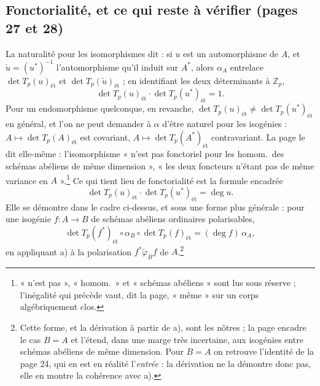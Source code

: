 \documentclass[11pt,a4paper]{article}
\begin{document}
\subsection*{Fonctorialité, et ce qui reste à vérifier (pages 27 et 28)}

La naturalité pour les isomorphismes dit : si $u$ est un automorphisme de $A$,
et $\check u = (u^*)^{-1}$ l'automorphisme qu'il induit sur $A^*$, alors
$\alpha_A$ entrelace $\det T_p(u)_{\text{ét}}$ et $\det T_p(\check
u)_{\text{ét}}$ ; en identifiant les deux déterminants à $\mathbb{Z}_p$,
\[
\det T_p(u)_{\text{ét}} \cdot \det T_p(u^*)_{\text{ét}} = 1 .
\]
Pour un endomorphisme quelconque, en revanche, $\det T_p(u)_{\text{ét}} \neq
\det T_p(u^*)_{\text{ét}}$ en général, et l'on ne peut demander à $\alpha$
d'être naturel pour les isogénies : $A \mapsto \det T_p(A)_{\text{ét}}$ est
covariant, $A \mapsto \det T_p(A^*)_{\text{ét}}$ contravariant. La page le dit
elle-même : l'isomorphisme « n'est pas fonctoriel pour les homom.\ des schémas
abéliens de même dimension », « les deux foncteurs n'étant pas de même
variance en $A$ ».\footnote{« n'est pas », « homom.\ » et « schémas
abéliens » sont lus sous réserve ; l'inégalité qui précède vaut, dit la page,
« même » sur un corps algébriquement clos.}
Ce qui tient lieu de fonctorialité est la formule encadrée
\[
\det T_p(u)_{\text{ét}} \cdot \det T_p(u^*)_{\text{ét}} = \deg u .
\]
Elle se démontre dans le cadre ci-dessus, et sous une forme plus générale : pour
une isogénie $f : A \to B$ de schémas abéliens ordinaires polarisables,
\[
\det T_p(f^*)_{\text{ét}} \circ \alpha_B \circ \det T_p(f)_{\text{ét}} = (\deg f)\,
\alpha_A ,
\]
en appliquant a) à la polarisation $f^*\tilde\varphi_B f$ de $A$.\footnote{Cette
forme, et la dérivation à partir de a), sont les nôtres ; la page encadre le
cas $B = A$ et l'étend, dans une marge très incertaine, aux isogénies entre
schémas abéliens de même dimension. Pour $B = A$ on retrouve l'identité de la
page 24, qui en est en réalité l'\emph{entrée} : la dérivation ne la démontre
donc pas, elle en montre la cohérence avec a).}
\end{document}
